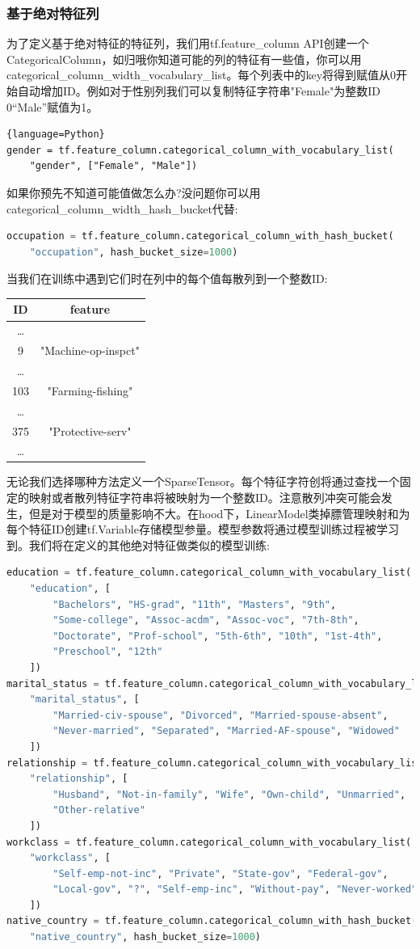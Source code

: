 \subsubsection{基于绝对特征列}
为了定义基于绝对特征的特征列，我们用tf.feature\_column API创建一个CategoricalColumn，如归哦你知道可能的列的特征有一些值，你可以用categorical\_column\_width\_vocabulary\_list。每个列表中的key将得到赋值从0开始自动增加ID。例如对于性别列我们可以复制特征字符串"Female"为整数ID 0“Male”赋值为1。
\begin{lstlisting}{language=Python}
gender = tf.feature_column.categorical_column_with_vocabulary_list(
    "gender", ["Female", "Male"])
\end{lstlisting}
如果你预先不知道可能值做怎么办?没问题你可以用categorical\_column\_width\_hash\_bucket代替:
\begin{lstlisting}[language=Python]
occupation = tf.feature_column.categorical_column_with_hash_bucket(
    "occupation", hash_bucket_size=1000)
\end{lstlisting}
当我们在训练中遇到它们时在列中的每个值每散列到一个整数ID:
\begin{tabular}{|c|c|}
\hline
ID&feature\\
\hline
\ldots&\\
\hline
9&"Machine-op-inspct"\\
\hline
\ldots&\\
\hline
103&"Farming-fishing"\\
\hline
\ldots&\\
\hline
375&"Protective-serv"\\
\hline
\ldots&\\
\hline
\end{tabular}
无论我们选择哪种方法定义一个SparseTensor。每个特征字符创将通过查找一个固定的映射或者散列特征字符串将被映射为一个整数ID。注意散列冲突可能会发生，但是对于模型的质量影响不大。在hood下，LinearModel类掉膘管理映射和为每个特征ID创建tf.Variable存储模型参量。模型参数将通过模型训练过程被学习到。我们将在定义的其他绝对特征做类似的模型训练:
\begin{lstlisting}[language=Python]
education = tf.feature_column.categorical_column_with_vocabulary_list(
    "education", [
        "Bachelors", "HS-grad", "11th", "Masters", "9th",
        "Some-college", "Assoc-acdm", "Assoc-voc", "7th-8th",
        "Doctorate", "Prof-school", "5th-6th", "10th", "1st-4th",
        "Preschool", "12th"
    ])
marital_status = tf.feature_column.categorical_column_with_vocabulary_list(
    "marital_status", [
        "Married-civ-spouse", "Divorced", "Married-spouse-absent",
        "Never-married", "Separated", "Married-AF-spouse", "Widowed"
    ])
relationship = tf.feature_column.categorical_column_with_vocabulary_list(
    "relationship", [
        "Husband", "Not-in-family", "Wife", "Own-child", "Unmarried",
        "Other-relative"
    ])
workclass = tf.feature_column.categorical_column_with_vocabulary_list(
    "workclass", [
        "Self-emp-not-inc", "Private", "State-gov", "Federal-gov",
        "Local-gov", "?", "Self-emp-inc", "Without-pay", "Never-worked"
    ])
native_country = tf.feature_column.categorical_column_with_hash_bucket(
    "native_country", hash_bucket_size=1000)
\end{lstlisting}
